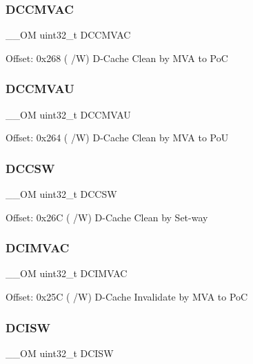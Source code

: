 \subsubsection{\texorpdfstring{DCCMVAC}{DCCMVAC}}
{\footnotesize\ttfamily \+\_\+\+\_\+\+OM uint32\+\_\+t D\+C\+C\+M\+V\+AC}

Offset\+: 0x268 ( /W) D-\/\+Cache Clean by M\+VA to PoC \mbox{\label{struct_s_c_b___type_a9d4029e220311690756d836948e71393}} 
\subsubsection{\texorpdfstring{DCCMVAU}{DCCMVAU}}
{\footnotesize\ttfamily \+\_\+\+\_\+\+OM uint32\+\_\+t D\+C\+C\+M\+V\+AU}

Offset\+: 0x264 ( /W) D-\/\+Cache Clean by M\+VA to PoU \mbox{\label{struct_s_c_b___type_a2bf149d6d8f4fa59e25aee340512cb79}} 
\subsubsection{\texorpdfstring{DCCSW}{DCCSW}}
{\footnotesize\ttfamily \+\_\+\+\_\+\+OM uint32\+\_\+t D\+C\+C\+SW}

Offset\+: 0x26C ( /W) D-\/\+Cache Clean by Set-\/way \mbox{\label{struct_s_c_b___type_a72402d657f9e448afce57bbd8577864d}} 
\subsubsection{\texorpdfstring{DCIMVAC}{DCIMVAC}}
{\footnotesize\ttfamily \+\_\+\+\_\+\+OM uint32\+\_\+t D\+C\+I\+M\+V\+AC}

Offset\+: 0x25C ( /W) D-\/\+Cache Invalidate by M\+VA to PoC \mbox{\label{struct_s_c_b___type_aca1ec746911b0934dd11c31d93a369be}} 
\subsubsection{\texorpdfstring{DCISW}{DCISW}}
{\footnotesize\ttfamily \+\_\+\+\_\+\+OM uint32\+\_\+t D\+C\+I\+SW}

